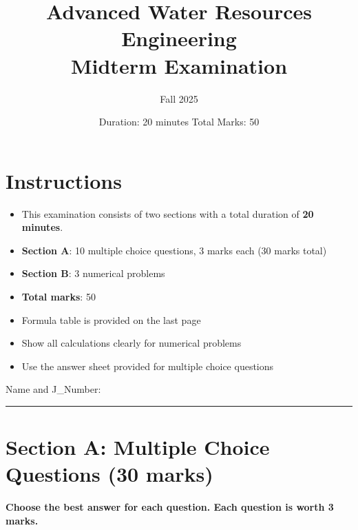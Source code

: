 \documentclass[11pt,a4paper]{article}
\title{\textbf{Advanced Water Resources Engineering\\
Midterm Examination}}
\author{Fall 2025}
\date{Duration: 20 minutes \quad Total Marks: 50}
\begin{document}
\maketitle

\vspace{-0.5cm}

\section*{Instructions}
\begin{itemize}[nosep]
    \item This examination consists of two sections with a total duration of \textbf{20 minutes}.
    \item \textbf{Section A}: 10 multiple choice questions, 3 marks each (30 marks total)
    \item \textbf{Section B}: 3 numerical problems
    \item \textbf{Total marks}: 50
    \item Formula table is provided on the last page
    \item Show all calculations clearly for numerical problems
    \item Use the answer sheet provided for multiple choice questions
\end{itemize}
\vspace{0.8cm}



Name and J\_Number: 
\vspace{0.1cm}

\hrule
\vspace{0.3cm}

\section*{Section A: Multiple Choice Questions (30 marks)}
\textbf{Choose the best answer for each question. Each question is worth 3 marks.}
\end{document}
